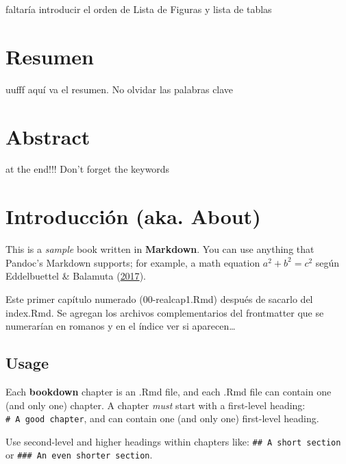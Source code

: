 \documentclass[
  12pt,
  twoside]{book}
\theoremstyle{definition}
\theoremstyle{definition}
\theoremstyle{definition}
\theoremstyle{definition}
\theoremstyle{remark}
\begin{document}
faltaría introducir el orden de Lista de Figuras y lista de tablas

\newpage

\hypertarget{resumen}{%
\chapter*{Resumen}\label{resumen}}

uufff aquí va el resumen. No olvidar las palabras clave

\newpage

\hypertarget{abstract}{%
\chapter*{Abstract}\label{abstract}}

at the end!!! Don't forget the keywords

\mainmatter

\hypertarget{introducciuxf3n-aka.-about}{%
\chapter*{Introducción (aka. About)}\label{introducciuxf3n-aka.-about}}

This is a \emph{sample} book written in \textbf{Markdown}. You can use anything that Pandoc's Markdown supports; for example, a math equation \(a^2 + b^2 = c^2\) según Eddelbuettel \& Balamuta (\protect\hyperlink{ref-eddelbuettel2017ExtendingBrief}{2017}).

Este primer capítulo numerado (00-realcap1.Rmd) después de sacarlo del index.Rmd. Se agregan los archivos complementarios del frontmatter que se numerarían en romanos y en el índice ver si aparecen\ldots{}

\hypertarget{usage}{%
\section{Usage}\label{usage}}

Each \textbf{bookdown} chapter is an .Rmd file, and each .Rmd file can contain one (and only one) chapter. A chapter \emph{must} start with a first-level heading: \texttt{\#\ A\ good\ chapter}, and can contain one (and only one) first-level heading.

Use second-level and higher headings within chapters like: \texttt{\#\#\ A\ short\ section} or \texttt{\#\#\#\ An\ even\ shorter\ section}.
\end{document}
